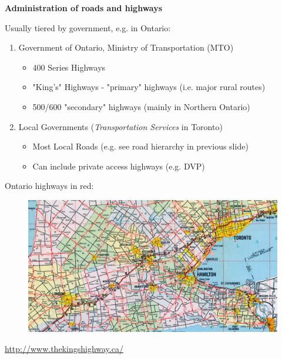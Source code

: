 \documentclass[aspectratio=169]{beamer}
\begin{document}
	




\begin{frame}
	
	\textbf{Administration of roads and highways}
	
	\vspace{2mm}
	
	Usually tiered by government, e.g. in Ontario:
	
	\begin{enumerate}
		
		\item Government of Ontario, Ministry of Transportation (MTO)
		\begin{itemize}
			\item 400 Series Highways
			\item "King's" Highways - "primary" highways (i.e. major rural routes)
			\item 500/600 "secondary" highways (mainly in Northern Ontario)	
		\end{itemize}
	
		\item Local Governments (\textit{Transportation Services} in Toronto)
		\begin{itemize}
			\item Most Local Roads (e.g. see road hierarchy in previous slide)
			\item Can include private access highways (e.g. DVP)
		\end{itemize}
		
	\end{enumerate}
	
\end{frame}



\begin{frame}
	
	Ontario highways in red:
	
		\begin{figure}
			\centering
			\includegraphics[width=1\linewidth]{images/ontario_road_map.png}
		\end{figure}
	
	\tiny\url{http://www.thekingshighway.ca/}

\end{frame}
\end{document}
